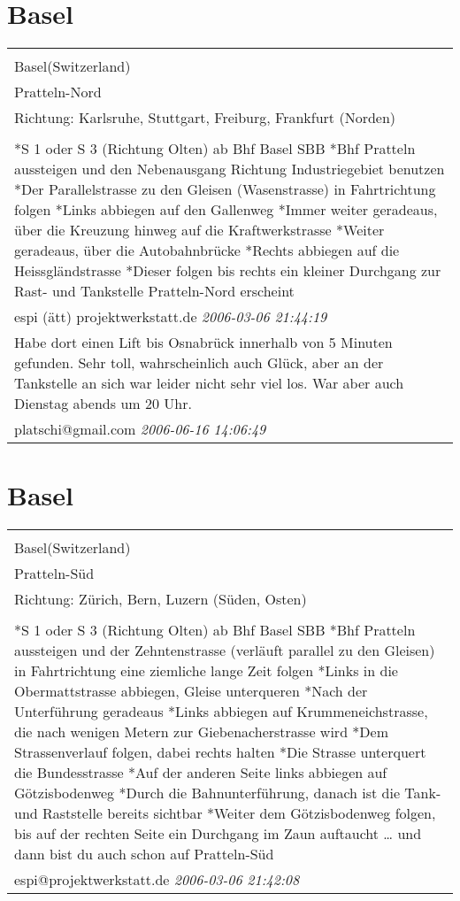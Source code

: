 \documentclass[a4paper,12pt]{article}
\begin{document}
\section{Basel}
\begin{tabular}{|p{13cm}|}
\hline\\
Basel(Switzerland)\\
Pratteln-Nord\\
Richtung: Karlsruhe, Stuttgart, Freiburg, Frankfurt (Norden) \\
\hline\\
*S 1 oder S 3 (Richtung Olten) ab Bhf Basel SBB
*Bhf Pratteln aussteigen und den Nebenausgang Richtung Industriegebiet benutzen
*Der Parallelstrasse zu den Gleisen (Wasenstrasse) in Fahrtrichtung folgen
*Links abbiegen auf den Gallenweg
*Immer weiter geradeaus, über die Kreuzung hinweg auf die Kraftwerkstrasse
*Weiter geradeaus, über die Autobahnbrücke
*Rechts abbiegen auf die Heissgländstrasse
*Dieser folgen bis rechts ein kleiner Durchgang zur Rast- und Tankstelle Pratteln-Nord erscheint \\
espi (ätt) projektwerkstatt.de \textit{ 2006-03-06 21:44:19 }\\\hline Habe dort einen Lift bis Osnabrück innerhalb von 5 Minuten gefunden. Sehr toll, wahrscheinlich auch Glück, aber an der Tankstelle an sich war leider nicht sehr viel los. War aber auch Dienstag abends um 20 Uhr. \\
platschi@gmail.com \textit{ 2006-06-16 14:06:49 }\\\hline
\end{tabular}


\section{Basel}
\begin{tabular}{|p{13cm}|}
\hline\\
Basel(Switzerland)\\
Pratteln-Süd\\
Richtung: Zürich, Bern, Luzern (Süden, Osten) \\
\hline\\
*S 1 oder S 3 (Richtung Olten) ab Bhf Basel SBB
*Bhf Pratteln aussteigen und der Zehntenstrasse (verläuft parallel zu den Gleisen) in Fahrtrichtung eine ziemliche lange Zeit folgen
*Links in die Obermattstrasse abbiegen, Gleise unterqueren
*Nach der Unterführung geradeaus
*Links abbiegen auf Krummeneichstrasse, die nach wenigen Metern zur Giebenacherstrasse wird
*Dem Strassenverlauf folgen, dabei rechts halten
*Die Strasse unterquert die Bundesstrasse
*Auf der anderen Seite links abbiegen auf Götzisbodenweg
*Durch die Bahnunterführung, danach ist die Tank- und Raststelle bereits sichtbar
*Weiter dem Götzisbodenweg folgen, bis auf der rechten Seite ein Durchgang im Zaun auftaucht … und dann bist du auch schon auf Pratteln-Süd \\
espi@projektwerkstatt.de \textit{ 2006-03-06 21:42:08 }\\\hline
\end{tabular}
\end{document}
